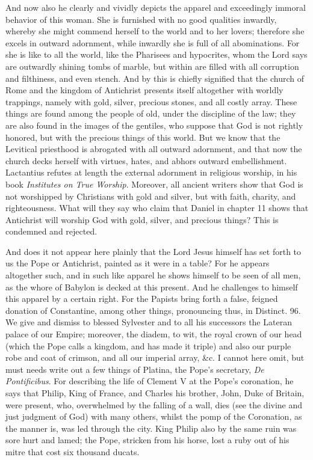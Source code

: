 And now also he clearly and vividly depicts the apparel and exceedingly immoral behavior of this woman. She is furnished with no good qualities inwardly, whereby she might commend herself to the world and to her lovers; therefore she excels in outward adornment, while inwardly she is full of all abominations. For she is like to all the world, like the Pharisees and hypocrites, whom the Lord says are outwardly shining tombs of marble, but within are filled with all corruption and filthiness, and even stench. And by this is chiefly signified that the church of Rome and the kingdom of Antichrist presents itself altogether with worldly trappings, namely with gold, silver, precious stones, and all costly array. These things are found among the people of old, under the discipline of the law; they are also found in the images of the gentiles, who suppose that God is not rightly honored, but with the precious things of this world. But we know that the Levitical priesthood is abrogated with all outward adornment, and that now the church decks herself with virtues, hates, and abhors outward embellishment. Lactantius refutes at length the external adornment in religious worship, in his book \textit{Institutes on True Worship}. Moreover, all ancient writers show that God is not worshipped by Christians with gold and silver, but with faith, charity, and righteousness. What will they say who claim that Daniel in chapter 11 shows that Antichrist will worship God with gold, silver, and precious things? This is condemned and rejected.

And does it not appear here plainly that the Lord Jesus himself has set forth to us the Pope or Antichrist, painted as it were in a table? For he appears altogether such, and in such like apparel he shows himself to be seen of all men, as the whore of Babylon is decked at this present. And he challenges to himself this apparel by a certain right. For the Papists bring forth a false, feigned donation of Constantine, among other things, pronouncing thus, in Distinct. 96. We give and dismiss to blessed Sylvester and to all his successors the Lateran palace of our Empire; moreover, the diadem, to wit, the royal crown of our head (which the Pope calls a kingdom, and has made it triple) and also our purple robe and coat of crimson, and all our imperial array, \&c. I cannot here omit, but must needs write out a few things of Platina, the Pope’s secretary, \textit{De Pontificibus}. For describing the life of Clement V at the Pope’s coronation, he says that Philip, King of France, and Charles his brother, John, Duke of Britain, were present, who, overwhelmed by the falling of a wall, dies (see the divine and just judgment of God) with many others, whilst the pomp of the Coronation, as the manner is, was led through the city. King Philip also by the same ruin was sore hurt and lamed; the Pope, stricken from his horse, lost a ruby out of his mitre that cost six thousand ducats.

